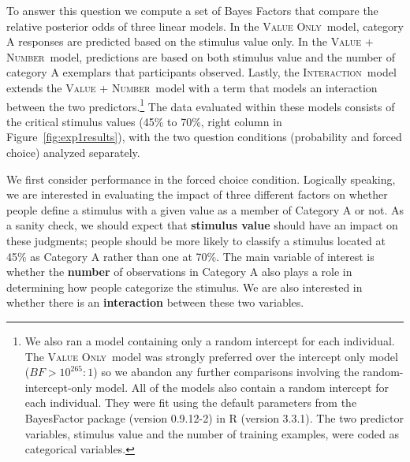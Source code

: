 \documentclass[doc,apacite]{apa6}
\newcommand{\valueonly}{\textsc{Value Only}}
\newcommand{\valuenumber}{\textsc{Value + Number}}
\newcommand{\interaction}{\textsc{Interaction}}
\begin{document}
To answer this question we compute a set of Bayes Factors that compare the relative posterior odds of three linear models.
In the \valueonly\ model, category A responses are predicted based
on the stimulus value only. In the \valuenumber\ model, predictions are based on
both stimulus value and the number of category A exemplars that participants
observed. Lastly, the \interaction\ model extends the \valuenumber\ model with a
term that models an interaction between the two predictors.\footnote{We also ran a model containing only a random intercept for each individual. The \valueonly\ model was strongly preferred over the intercept only model ($ BF > 10^{265} : 1 $) so we abandon any further comparisons involving the random-intercept-only model. All of the models also contain a random intercept for each individual. They were fit using the default parameters \cite{rouder2012default, liang2008mixtures} from the BayesFactor package (version 0.9.12-2) in R (version 3.3.1). The two predictor variables, stimulus value and the number of training examples, were coded as categorical variables.}
The data evaluated within these models consists of the critical stimulus values (45\% to 70\%, right column in Figure~\ref{fig:exp1results}), with the two question conditions ({\sc probability} and {\sc forced choice}) analyzed separately.

We first consider performance in the {\sc forced choice} condition. Logically speaking, we are interested in evaluating the impact of three different factors on whether people define a stimulus with a given value as a member of Category A or not. As a sanity check, we should expect that {\bf stimulus value} should have an impact on these judgments; people should be more likely to classify a stimulus located at 45\% as Category A rather than one at 70\%. The main variable of interest is whether the {\bf number} of observations in Category A also plays a role in determining how people categorize the stimulus. We are also interested in whether there is an {\bf interaction} between these two variables.
\end{document}
